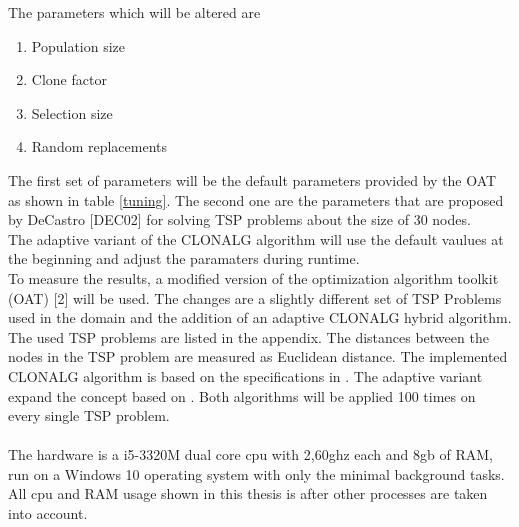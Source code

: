The parameters which will be altered are
\begin{enumerate}
	\item 	Population size
	\item 	Clone factor
	\item 	Selection size
	\item 	Random replacements	
\end{enumerate}
The first set of parameters will be the default parameters provided by the OAT as shown in table \ref{tuning}. The second one are the parameters that are proposed by DeCastro [DEC02] for solving TSP problems about the size of 30 nodes.\\
The adaptive variant of the CLONALG algorithm will use the default vaulues at the beginning and adjust the paramaters during runtime.\\
To measure the results, a modified version of the optimization algorithm toolkit (OAT) [2] will be used. The changes are a slightly different set of TSP Problems used in the domain and the addition of an adaptive CLONALG hybrid algorithm. The used TSP problems are listed in the appendix. The distances between the nodes in the TSP problem are measured as Euclidean distance. The implemented CLONALG algorithm is based on the specifications in \cite{DEC02}. The adaptive variant expand the concept based on \cite{Garret04}.
Both algorithms will be applied 100 times on every single TSP problem.\\\\
The hardware is a i5-3320M dual core cpu with 2,60ghz each and 8gb of RAM, run on a Windows 10 operating system with only the minimal background tasks. All cpu and RAM usage shown in this thesis is after other processes are taken into account.
